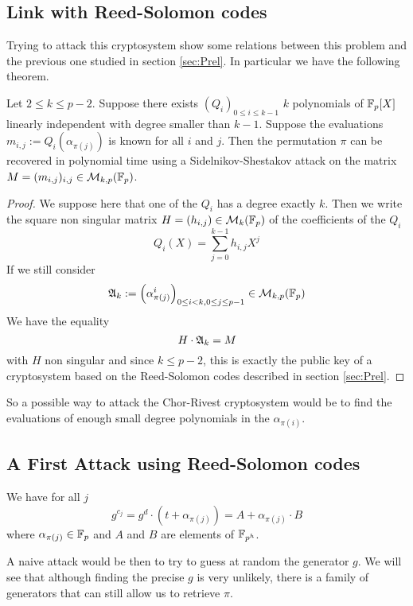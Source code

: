 \documentclass[12pt,a4paper,titlepage]{article}
\newcommand{\GF}[1]{\F_{#1}}
\begin{document}
\subsection{Link with Reed-Solomon codes}

Trying to attack this cryptosystem show some relations between this problem and the previous one studied in section \ref{sec:Prel}. In particular we have the following theorem.

\begin{theorem}
\label{thm:link}
Let $2 \leq k \leq p-2$.
Suppose there exists $(Q_i)_{0 \leq i \leq k-1}$ $k$ polynomials of $\GF{p}[X]$ linearly independent with degree smaller than $k-1$.
Suppose the evaluations $m_{i,j} := Q_i(\alpha_{\pi(j)})$ is known for all $i$ and $j$.
Then the permutation $\pi$ can be recovered in polynomial time using a Sidelnikov-Shestakov attack on the matrix $M = (m_{i,j})_{i,j} \in \mathcal{M}_{k,p}(\GF{p})$.
\end{theorem}
\begin{proof}
We suppose here that one of the $Q_i$ has a degree exactly $k$.
Then we write the square non singular matrix $H = (h_{i,j}) \in \mathcal{M}_k(\GF{p})$ of the coefficients of the $Q_i$
$$ Q_i(X) = \sum_{j=0}^{k-1} h_{i,j} X^j $$
If we still consider
$$ \A_k := \left( \alpha_{\pi(j)}^i \right)_{0 \leq i < k, 0 \leq j \leq p-1} \in \mathcal{M}_{k,p}(\GF{p})$$
We have the equality
$$ H \cdot \mathfrak{A}_k = M$$
with $H$ non singular and since $k \leq p-2$, this is exactly the public key of a cryptosystem based on the Reed-Solomon codes described in section \ref{sec:Prel}.
\end{proof}

So a possible way to attack the Chor-Rivest cryptosystem would be to find the evaluations of enough small degree polynomials in the $\alpha_{\pi(i)}$.



\subsection{A First Attack using Reed-Solomon codes}

We have for all $j$
$$ g^{c_j} = g^d \cdot (t + \alpha_{\pi(j)} ) = A + \alpha_{\pi(j)} \cdot B $$
where $\alpha_{\pi(j)} \in \GF{p}$ and $A$ and $B$ are elements of $\GF{p^h}$.

A naive attack would be then to try to guess at random the generator $g$. We will see that although finding the precise $g$ is very unlikely, there is a family of generators that can still allow us to retrieve $\pi$.
\end{document}
